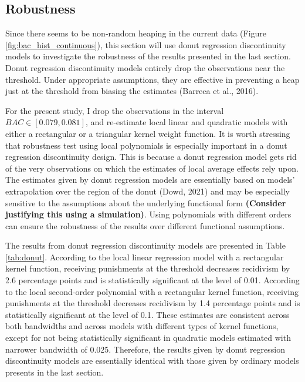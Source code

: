 \documentclass[
  11pt,
]{article}
\begin{document}
\hypertarget{robustness}{%
\subsection{Robustness}\label{robustness}}

Since there seems to be non-random heaping in the current data (Figure
\ref{fig:bac_hist_continuous}), this section will use donut regression
discontinuity models to investigate the robustness of the results
presented in the last section. Donut regression discontinuity models
entirely drop the observations near the threshold. Under appropriate
assumptions, they are effective in preventing a heap just at the
threshold from biasing the estimates (Barreca et al., 2016).

For the present study, I drop the observations in the interval
\(BAC \in [0.079, 0.081]\), and re-estimate local linear and quadratic
models with either a rectangular or a triangular kernel weight function.
It is worth stressing that robustness test using local polynomials is
especially important in a donut regression discontinuity design. This is
because a donut regression model gets rid of the very observations on
which the estimates of local average effects rely upon. The estimates
given by donut regression models are essentially based on models'
extrapolation over the region of the donut (Dowd, 2021) and may be
especially sensitive to the assumptions about the underlying functional
form \textbf{(Consider justifying this using a simulation)}. Using
polynomials with different orders can ensure the robustness of the
results over different functional assumptions.

The results from donut regression discontinuity models are presented in
Table \ref{tab:donut}. According to the local linear regression model
with a rectangular kernel function, receiving punishments at the
threshold decreases recidivism by 2.6 percentage points and is
statistically significant at the level of 0.01. According to the local
second-order polynomial with a rectangular kernel function, receiving
punishments at the threshold decreases recidivism by 1.4 percentage
points and is statistically significant at the level of 0.1. These
estimates are consistent across both bandwidths and across models with
different types of kernel functions, except for not being statistically
significant in quadratic models estimated with narrower bandwidth of
0.025. Therefore, the results given by donut regression discontinuity
models are essentially identical with those given by ordinary models
presents in the last section.
\end{document}
